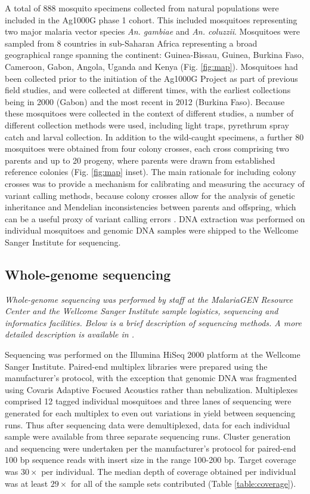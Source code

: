 \documentclass[a4paper,11pt,abstracton,hidelinks]{scrartcl}
\begin{document}
A total of 888 mosquito specimens collected from natural populations were included in the Ag1000G phase 1 cohort.
%
This included mosquitoes representing two major malaria vector species  \textit{An. gambiae} and \textit{An. coluzzii}.
%
Mosquitoes were sampled from 8 countries in sub-Saharan Africa representing a broad geographical range spanning the continent: Guinea-Bissau, Guinea, Burkina Faso, Cameroon, Gabon, Angola, Uganda and Kenya (Fig. \ref{fig:map}).
%
Mosquitoes had been collected prior to the initiation of the Ag1000G Project as part of previous field studies, and were collected at different times, with the earliest collections being in 2000 (Gabon) and the most recent in 2012 (Burkina Faso).
%
Because these mosquitoes were collected in the context of different studies, a number of different collection methods were used, including light traps, pyrethrum spray catch and larval collection.
%
In addition to the wild-caught specimens, a further 80 mosquitoes were obtained from four colony crosses, each cross comprising two parents and up to 20 progeny, where parents were drawn from established reference colonies (Fig. \ref{fig:map} inset).
%
The main rationale for including colony crosses was to provide a mechanism for calibrating and measuring the accuracy of variant calling methods, because colony crosses allow for the analysis of genetic inheritance and Mendelian inconsistencies between parents and offspring, which can be a useful proxy of variant calling errors \citep{Saunders2007,Pilipenko2014}.
%
DNA extraction was performed on individual mosquitoes and genomic DNA samples were shipped to the Wellcome Sanger Institute for sequencing.


\subsection{Whole-genome sequencing}


\textit{Whole-genome sequencing was performed by staff at the MalariaGEN Resource Center and the Wellcome Sanger Institute sample logistics, sequencing and informatics facilities. Below is a brief description of sequencing methods. A more detailed description is available in \citet{Ag1000G2017}.}


Sequencing was performed on the Illumina HiSeq 2000 platform at the Wellcome Sanger Institute.
%
Paired-end multiplex libraries were prepared using the manufacturer's protocol, with the exception that genomic DNA was fragmented using Covaris Adaptive Focused Acoustics rather than nebulization.
%
Multiplexes comprised 12 tagged individual mosquitoes and three lanes of sequencing were generated for each multiplex to even out variations in yield between sequencing runs.
%
Thus after sequencing data were demultiplexed, data for each individual sample were available from three separate sequencing runs.
%
Cluster generation and sequencing were undertaken per the manufacturer's protocol for paired-end 100 bp sequence reads with insert size in the range 100-200 bp.
%
Target coverage was $30\times$ per individual.
%
The median depth of coverage obtained per individual was at least $29\times$ for all of the sample sets contributed (Table \ref{table:coverage}).
%
\end{document}
